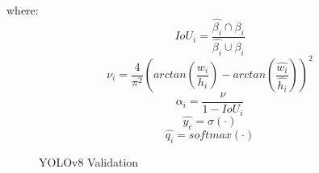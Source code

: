 \documentclass[10pt,twocolumn,letterpaper]{article}
\begin{document}
where:
\begin{equation}\label{IoU}
IoU_i = \dfrac{\hat{\beta_{i}}\displaystyle \cap\beta_{i}}{\hat{\beta_{i}}\displaystyle \cup\beta_{i}}
\end{equation}
\begin{equation}\label{v}
\nu_i = \dfrac{4}{\pi^2}(arctan(\dfrac{w_{i}}{h_{i}}) - arctan(\dfrac{\hat{w_{i}}}{\hat{h_{i}}}))^2
\end{equation}
\begin{equation}\label{a}
\alpha_i = \dfrac{\nu}{1 - IoU_i}
\end{equation}
\begin{equation}\label{y_hat}
\hat{y_c} = \sigma({\cdot})
\end{equation}
\begin{equation}\label{q_hat}
\hat{q_i} = softmax({\cdot})
\end{equation}





\begin{figure}[h]
    \centering
    \qquad
    \caption{YOLOv8 Validation}%
    \label{fig:Model_Evaluation}
\end{figure}
\end{document}
